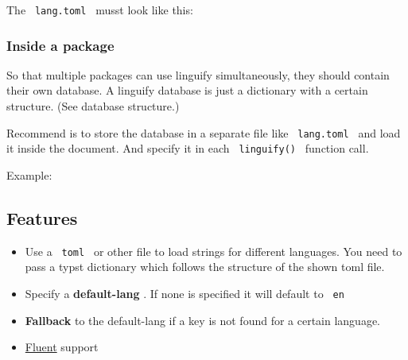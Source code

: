 The \texttt{\ lang.toml\ } musst look like this:

\begin{Shaded}
\begin{Highlighting}[]
\KeywordTok{[conf]}
 \OperatorTok{=} 

\KeywordTok{[en]}
 \OperatorTok{=} 
 \OperatorTok{=} 

\KeywordTok{[de]}
 \OperatorTok{=} 
 \OperatorTok{=} 
\end{Highlighting}
\end{Shaded}

\subsubsection{Inside a package}\label{inside-a-package}

So that multiple packages can use linguify simultaneously, they should
contain their own database. A linguify database is just a dictionary
with a certain structure. (See database structure.)

Recommend is to store the database in a separate file like
\texttt{\ lang.toml\ } and load it inside the document. And specify it
in each \texttt{\ linguify()\ } function call.

Example:

\begin{Shaded}
\begin{Highlighting}[]


\end{Highlighting}
\end{Shaded}

\subsection{Features}\label{features}

\begin{itemize}
\tightlist
\item
  Use a \texttt{\ toml\ } or other file to load strings for different
  languages. You need to pass a typst dictionary which follows the
  structure of the shown toml file.
\item
  Specify a \textbf{default-lang} . If none is specified it will default
  to \texttt{\ en\ }
\item
  \textbf{Fallback} to the default-lang if a key is not found for a
  certain language.
\item
  \href{https://projectfluent.org/}{Fluent} support
\end{itemize}

